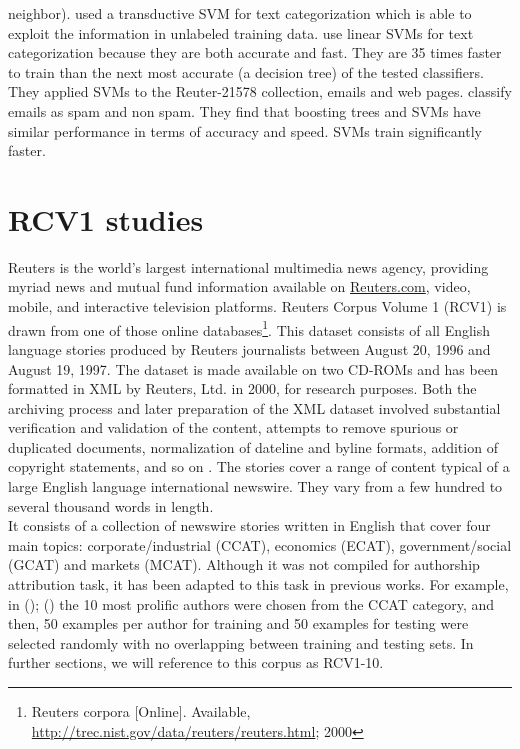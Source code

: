 neighbor). \citeauthor{joachims1999transductive} \cite{joachims1999transductive} used a transductive SVM for text categorization which is able to exploit the information in unlabeled training data.
\citeauthor{dumais1998inductive} \cite{dumais1998inductive} use linear SVMs for text categorization because they are both accurate and fast. They are 35 times faster to train than the next most accurate (a decision tree) of the tested classifiers. They applied SVMs to the Reuter-21578 collection, emails and web pages.
\citeauthor{drucker1999support} \cite{drucker1999support} classify emails as spam and non spam. They find that boosting trees and SVMs have similar performance in terms of accuracy and speed. SVMs train significantly faster.

\section{RCV1 studies}
Reuters is the world’s largest international multimedia news agency, providing myriad news and mutual fund information available on \url{Reuters.com}, video, mobile, and interactive television platforms. Reuters Corpus Volume 1 (RCV1) is drawn from one of those online databases\footnote{Reuters corpora [Online]. Available, \url{http://trec.nist.gov/data/reuters/reuters.html}; 2000}. This dataset consists of all English language stories produced by Reuters journalists between August 20, 1996 and August 19, 1997. The dataset is made available on two CD-ROMs and has been formatted in XML by Reuters, Ltd. in 2000, for research purposes. Both the archiving process and later preparation of
the XML dataset involved substantial verification and validation of the content, attempts to remove spurious or duplicated documents, normalization of dateline and byline formats, addition of copyright statements, and so on \cite{cheng2011author}. The stories cover a range of content typical of a large English language international newswire. They vary from a few hundred to several thousand words in length.\\
It consists of a collection of newswire stories written in English that cover four main topics: corporate/industrial (CCAT), economics (ECAT), government/social (GCAT) and markets (MCAT).
Although it was not compiled for authorship attribution task, it has been adapted to this task in previous works. For example, in \citeauthor{stamatatos2008author} (\citeyear{stamatatos2008author}); \citeauthor{plakias2008tensor} (\citeyear{plakias2008tensor}) the 10 most prolific authors were chosen from the CCAT category, and then, 50 examples per author for training and 50 examples for testing were selected randomly with no overlapping between training and testing sets. In further sections, we will reference to this corpus as RCV1-10.\\
